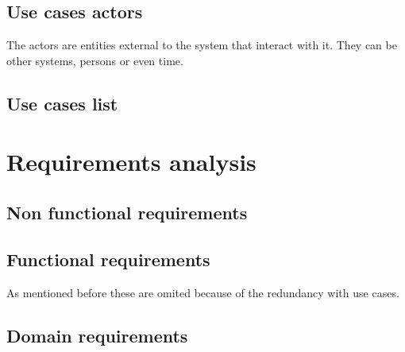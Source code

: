 \subsection{Use cases actors}
The actors are entities external to the system that interact with it. They can be other systems, persons or even time.

\subsection{Use cases list}

\section{Requirements analysis}

\subsection{Non functional requirements}

\subsection{Functional requirements}
As mentioned before these are omited because of the redundancy with use cases.

\subsection{Domain requirements}
